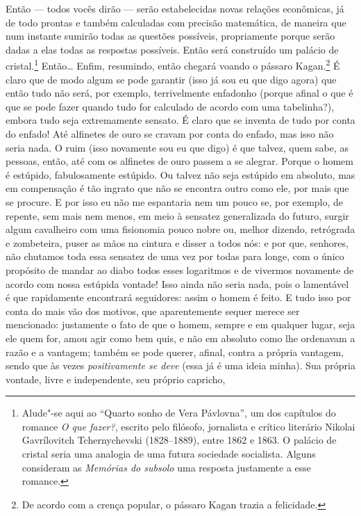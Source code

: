 Então --- todos vocês dirão --- serão estabelecidas novas relações econômicas,
já de todo prontas e também calculadas com precisão matemática, de maneira que
num instante sumirão todas as questões possíveis, propriamente porque serão
dadas a elas todas as respostas possíveis. Então será construído um palácio de
cristal.\footnote{Alude"-se aqui ao ``Quarto sonho de Vera Pávlovna'', um dos
capítulos do romance \textit{O que fazer?}, escrito pelo filósofo,
jornalista e crítico literário Nikolai Gavrílovitch Tchernychevski (1828--1889),
entre 1862 e 1863. O palácio de cristal seria uma analogia de uma futura
sociedade socialista. Alguns consideram as \textit{Memórias do subsolo} uma
resposta justamente a esse romance.} Então\ldots{} Enfim, resumindo, então
chegará voando o pássaro Kagan.\footnote{ De acordo com a crença popular, o
pássaro Kagan trazia a felicidade.} É claro que de modo algum se pode garantir
(isso já sou eu que digo agora) que então tudo não será, por exemplo,
terrivelmente enfadonho (porque afinal o que é que se pode fazer quando tudo
for calculado de acordo com uma tabelinha?), embora tudo seja extremamente
sensato. É claro que se inventa de tudo por conta do enfado! Até alfinetes de
ouro se cravam por conta do enfado, mas isso não seria nada. O ruim (isso
novamente sou eu que digo) é que talvez, quem sabe, as pessoas, então, até com
os alfinetes de ouro passem a se alegrar.  Porque o homem é estúpido,
fabulosamente estúpido. Ou talvez não seja estúpido em absoluto, mas em
compensação é tão ingrato que não se encontra outro como ele, por mais que se
procure. E por isso eu não me espantaria nem um pouco se, por exemplo, de
repente, sem mais nem menos, em meio à sensatez generalizada do futuro, surgir
algum cavalheiro com uma fisionomia pouco nobre ou, melhor dizendo, retrógrada
e zombeteira, puser as mãos na cintura e disser a todos nós: e por que,
senhores, não chutamos toda essa sensatez de uma vez por todas para longe, com
o único propósito de mandar ao diabo todos esses logaritmos e de vivermos
novamente de acordo com nossa estúpida vontade! Isso ainda não seria nada, pois
o lamentável é que rapidamente encontrará seguidores: assim o homem é feito. E
tudo isso por conta do mais vão dos motivos, que aparentemente sequer merece
ser mencionado: justamente o fato de que o homem, sempre e em qualquer lugar,
seja ele quem for, amou agir como bem quis, e não em absoluto como lhe
ordenavam a razão e a vantagem; também se pode querer, afinal, contra a própria
vantagem, sendo que às vezes \textit{positivamente se deve} (essa já é uma
ideia minha). Sua própria vontade, livre e independente, seu próprio capricho,
